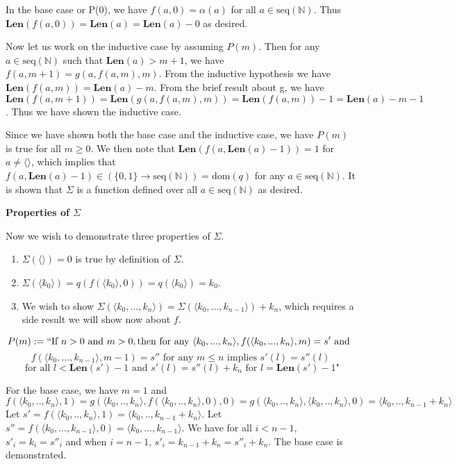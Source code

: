 \documentclass{article}
\newcommand{ \len }[0]{ \textbf{Len} }
\newcommand{ \seqnat }[0]{ \text{seq}(\mathbb{N}) }
\newcommand{ \dom }[0]{\text{dom}}
\begin{document}
\begin{enumerate}
		  In the base case or P(0), we have $f(a, 0) = \alpha(a)$ for all $a \in \seqnat$. Thus $\len(f(a,0)) = \len(a) = \len(a) - 0$ as desired.
		   
		   \medskip
		   Now let us work on the inductive case by assuming $P(m)$. Then for any $a \in \seqnat$ such that $\len(a) > m + 1$, we have $f(a, m + 1) = g(a, f(a, m), m)$. From the inductive hypothesis we have $\len(f(a,m)) = \len(a) - m$. From the brief result about g, we have $\len(f(a, m + 1)) = \len(g(a, f(a, m), m)) = \len(f(a,m)) - 1 = \len(a) - m - 1$. Thus we have shown the inductive case.
		   
		   \medskip
		   Since we have shown both the base case and the inductive case, we have $P(m)$ is true for all $m \geq 0$. We then note that $\len(f(a, \len(a) - 1)) = 1$ for $a \neq \langle \rangle$, which implies that $f(a, \len(a) - 1) \in (\{0,1\} \xrightarrow{} \seqnat) = \dom(q)$ for any $a \in \seqnat$. It is shown that $\Sigma$ is a function defined over all $a \in \seqnat$ as desired.
		   
		   \medskip
		   \textbf{Properties of $\Sigma$}
		   \medskip
		   
		   Now we wish to demonstrate three properties of $\Sigma$.
		   
		   \begin{enumerate}
		   	\item $\Sigma(\langle \rangle) = 0$ is true by definition of $\Sigma$.
			\item $\Sigma(\langle k_0 \rangle) = q(f(\langle k_0 \rangle, 0)) = q(\langle k_0 \rangle) = k_0$.
			\item We wish to show $\Sigma(\langle k_0, ..., k_n \rangle) = \Sigma(\langle k_0, ..., k_{n - 1}\rangle) + k_n$, which requires a side result we will show now about $f$. 
		   \end{enumerate}
			
			$$P(m) := ``\text{If } n > 0 \text{ and } m > 0, \text{then for any } \langle k_0, ..., k_n \rangle, f(\langle k_0, ..., k_n \rangle, m) = s' \text{ and }$$ 
			$$f(\langle k_0, ..., k_{n - 1}\rangle, m - 1) = s'' \text{ for any } m \leq n \text{ implies } s'(l) = s''(l)$$
			$$\text{ for all } l < \len(s') - 1 \text{ and } s'(l) = s''(l) + k_n \text{ for } l = \len(s') - 1\text{"}$$
			
			\medskip
			
			For the base case, we have $m = 1$ and $$f(\langle k_0, .., k_n \rangle, 1) = g(\langle k_0, .., k_n \rangle, f(\langle k_0, .., k_n \rangle, 0), 0) = g(\langle k_0, .., k_n \rangle, \langle k_0, .., k_{n} \rangle, 0) = \langle k_0, .., k_{n - 1} + k_n \rangle$$ 
			Let $s' = f(\langle k_0, .., k_n \rangle, 1) = \langle k_0, .., k_{n - 1} + k_n \rangle$.
			Let $s'' = f(\langle k_0, ..., k_{n - 1} \rangle, 0) = \langle k_0, ..., k_{n - 1} \rangle$.
			We have for all $i < n - 1$, $s'_{i} = k_{i} = s''_{i}$ and when $i = n - 1$, $s'_{i} = k_{n - 1} + k_n = s''_{i} + k_n$. The base case is demonstrated.
			

\end{enumerate}
\end{document}
